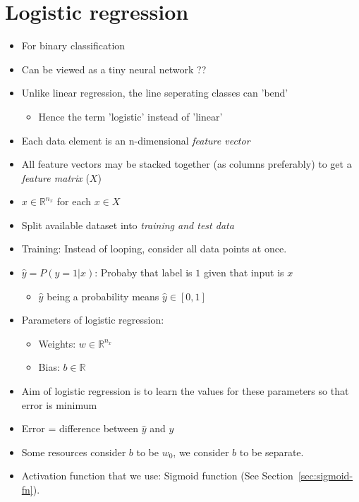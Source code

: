 \documentclass{article}
\begin{document}
\section{Logistic regression}
\begin{itemize}
  \item For binary classification
  \item Can be viewed as a tiny neural network ??
  \item Unlike linear regression, the line seperating classes can
    'bend'
  \begin{itemize}
    \item Hence the term 'logistic' instead of 'linear'
  \end{itemize}
  \item Each data element is an n-dimensional \emph{feature vector}
  \item All feature vectors may be stacked together (as columns
    preferably) to get a \emph{feature matrix} ($X$)
  \item $x \in \mathbb{R}^{n_x}$ for each $x \in X$
  \item Split available dataset into \emph{training and test data}
  \item Training: Instead of looping, consider all data points at once.
  \item $\hat{y} = P(y=1 | x)$: Probaby that label is $1$ given that
    input is $x$
  \begin{itemize}
    \item $\hat{y}$ being a probability means $\hat{y} \in [0, 1]$
  \end{itemize}
  \item Parameters of logistic regression:
  \begin{itemize}
    \item Weights: $w \in \mathbb{R}^{n_x}$
    \item Bias: $b \in \mathbb{R}$
  \end{itemize}
  \item Aim of logistic regression is to learn the values for these
    parameters so that error is minimum
  \item Error = difference between $\hat{y}$ and $y$
  \item Some resources consider $b$ to be $w_0$, we consider $b$ to be separate.
  \item Activation function that we use: Sigmoid function (See Section~\ref{sec:sigmoid-fn}).
\end{itemize}
\end{document}
